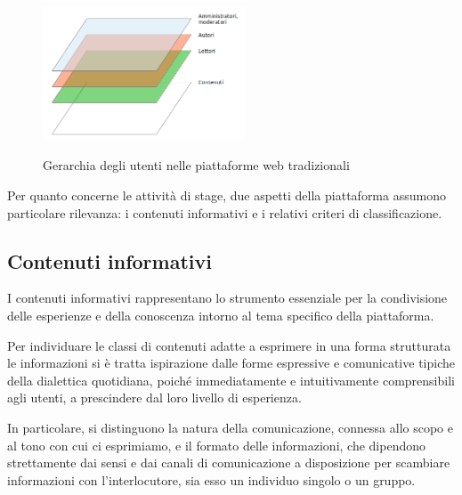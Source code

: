 \begin{figure}[ht]
	\begin{center}
		\includegraphics[width=6cm]{img/gerarchia-utenti.png}
		\label{fig:tesi:progetto:gerarchia-utenti}
		\caption[Gerarchia degli utenti]{Gerarchia degli utenti nelle piattaforme web tradizionali}
	\end{center}
\end{figure}

Per quanto concerne le attività di stage, due aspetti della piattaforma assumono particolare rilevanza: i contenuti informativi e i relativi criteri di classificazione.

\subsection{Contenuti informativi}
\label{sec:tesi:progetto:contenuti}
I contenuti informativi rappresentano lo strumento essenziale per la condivisione delle esperienze e della conoscenza intorno al tema specifico della piattaforma.

Per individuare le classi di contenuti adatte a esprimere in una forma strutturata le informazioni si è tratta ispirazione dalle forme espressive e comunicative tipiche della dialettica quotidiana, poiché immediatamente e intuitivamente comprensibili agli utenti, a prescindere dal loro livello di esperienza.

In particolare, si distinguono la natura della comunicazione, connessa allo scopo e al tono con cui ci esprimiamo, e il formato delle informazioni, che dipendono strettamente dai sensi e dai canali di comunicazione a disposizione per scambiare informazioni con l'interlocutore, sia esso un individuo singolo o un gruppo.

